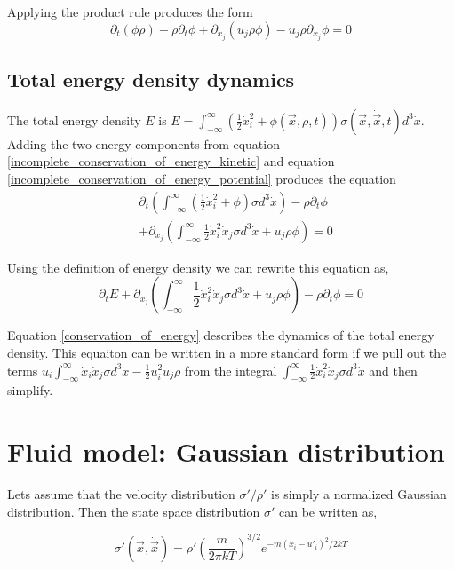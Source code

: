 \documentclass[%
 twocolumn,
 preprint, onecolumn,
 amsmath,amssymb,
 aps,
]{revtex4-1}
\newcommand{\dvec}[1]{\dot{\vec{#1}}}
\newcommand{\intVdot}[1]{\int_{-\infty}^{\infty} #1 d^3\dot{x}}
\begin{document}
Applying the product rule produces the form
\begin{equation}
\partial_t\left(\phi\rho\right) - \rho\partial_t\phi + \partial_{x_j}\left(u_j\rho\phi\right) - u_j\rho\partial_{x_j}\phi=0
\label{incomplete_conservation_of_energy_potential}
\end{equation}


\subsection{Total energy density dynamics}
The total energy density $E$ is $E=\intVdot{\left(\frac{1}{2}\dot{x}_i^2 + \phi(\vec{x}, \rho, t)\right)\sigma(\vec{x}, \dvec{x}, t)}$. Adding the two energy components from equation \eqref{incomplete_conservation_of_energy_kinetic} and equation \eqref{incomplete_conservation_of_energy_potential} produces the equation
\[
\begin{split}
& \partial_t\left(\intVdot{\left(\frac{1}{2}\dot{x}_i^2 + \phi\right)\sigma}\right) - \rho\partial_t\phi \\& + \partial_{x_j}\left(\intVdot{\frac{1}{2}\dot{x}_i^2\dot{x}_j\sigma} + u_j\rho\phi\right)=0
\end{split}
\]

Using the definition of energy density we can rewrite this equation as, 
\begin{equation}
\partial_t E + \partial_{x_j}\left(\intVdot{\frac{1}{2}\dot{x}_i^2\dot{x}_j\sigma} + u_j\rho\phi\right) - \rho\partial_t\phi=0
\label{conservation_of_energy}
\end{equation}

Equation \eqref{conservation_of_energy} describes the dynamics of the total energy density. This equaiton can be written in a more standard form if we pull out the terms $u_i\intVdot{\dot{x}_i\dot{x}_j\sigma} - \frac{1}{2}u_i^2u_j\rho$ from the integral $\intVdot{\frac{1}{2}\dot{x}_i^2\dot{x}_j\sigma}$ and then simplify.

\section{Fluid model: Gaussian distribution}
Lets assume that the velocity distribution $\sigma'/\rho'$ is simply a normalized Gaussian distribution. Then the state space distribution $\sigma'$ can be written as,

\begin{equation}
\sigma'(\vec{x}, \dvec{x}) = \rho'\left(\frac{m}{2\pi kT}\right)^{3/2}e^{-m\left(x_i - u'_i\right)^2/2kT}
\label{gaussian_state_space}
\end{equation}
\end{document}
